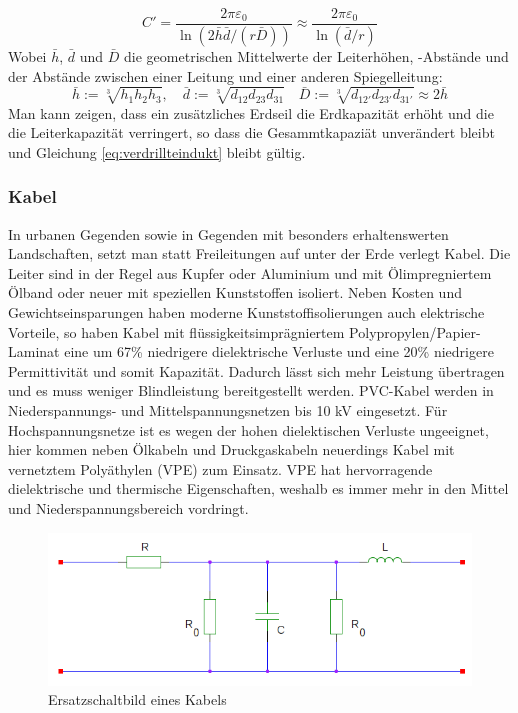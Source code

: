 \begin{equation}\label{eq:verdrillteindukt}
C' = \frac{2\pi\varepsilon_0}{\ln\left(2 \bar{h}\bar{d}/(r\bar{D})\right) } \approx
\frac{2\pi\varepsilon_0}{\ln\left(\bar{d}/r\right)}
\end{equation}
Wobei $\bar{h}$, $\bar{d}$ und $\bar{D}$ die geometrischen Mittelwerte der Leiterhöhen, -Abstände und der Abstände zwischen einer Leitung und einer anderen \q Spiegelleitung\q : %
\begin{equation}
\bar{h} := \sqrt[3]{h_1h_2h_3}, \quad \bar{d} := \sqrt[3]{d_{12}d_{23}d_{31}} \quad \bar{D} := \sqrt[3]{d_{12'}d_{23'}d_{31'}} \approx 2\bar{h}
\end{equation}
Man kann zeigen, dass ein zusätzliches Erdseil die Erdkapazität erhöht und die die Leiterkapazität verringert, so dass die Gesammtkapaziät unverändert bleibt und Gleichung \eqref{eq:verdrillteindukt} bleibt gültig.\cite{Flosdorff}


\subsubsection{Kabel}
In urbanen Gegenden sowie in Gegenden mit besonders erhaltenswerten Landschaften, setzt man statt Freileitungen auf unter der Erde verlegt Kabel. Die Leiter sind in der Regel aus Kupfer oder Aluminium und mit Ölimpregniertem Ölband oder neuer mit speziellen Kunststoffen isoliert. %
Neben Kosten und Gewichtseinsparungen haben moderne Kunststoffisolierungen auch elektrische Vorteile, so haben Kabel mit flüssigkeitsimprägniertem Polypropylen/Papier-Laminat eine um 67\% niedrigere dielektrische Verluste und eine 20\% niedrigere Permittivität und somit Kapazität.\cite{Harrison} Dadurch lässt sich mehr Leistung übertragen und es muss weniger Blindleistung bereitgestellt werden.
PVC-Kabel werden in Niederspannungs- und Mittelspannungsnetzen bis 10 kV eingesetzt. Für Hochspannungsnetze ist es wegen der hohen dielektischen Verluste ungeeignet, hier kommen neben Ölkabeln und Druckgaskabeln neuerdings Kabel mit vernetztem Polyäthylen (VPE) zum Einsatz. VPE hat hervorragende dielektrische und thermische Eigenschaften, weshalb es immer mehr in den Mittel und Niederspannungsbereich vordringt.\cite{Flosdorff}

\begin{figure}[tbhn]
\begin{center}
\noindent
\includegraphics[scale=0.5]{kabel.png}
\end{center}
\caption{Ersatzschaltbild eines Kabels} %
\label{pic:Ersatzschaltbildkabel}
\end{figure}

